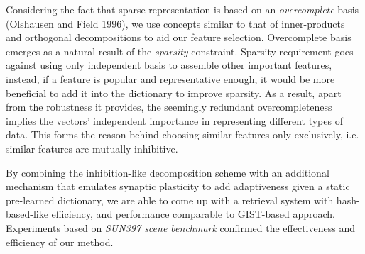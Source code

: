 \documentclass[letterpaper]{article}
\begin{document}
Considering the fact that sparse representation is based on an \emph{overcomplete} basis (Olshausen and Field 1996), we use concepts similar to that of inner-products and orthogonal decompositions to aid our feature selection. Overcomplete basis emerges as a natural result of the \emph{sparsity} constraint. Sparsity requirement goes against using only independent basis to assemble other important features, instead, if a feature is popular and representative enough, it would be more beneficial to add it into the dictionary to improve sparsity. As a result, apart from the robustness it provides, the seemingly redundant overcompleteness implies the vectors' independent importance in representing different types of data. This forms the reason behind choosing similar features only exclusively, i.e. similar features are mutually inhibitive. 

By combining the inhibition-like decomposition scheme with an additional mechanism that emulates synaptic plasticity to add adaptiveness given a static pre-learned dictionary, we are able to come up with a retrieval system with hash-based-like efficiency, and performance comparable to GIST-based approach. Experiments based on \emph{SUN397 scene benchmark} confirmed the effectiveness and efficiency of our method.


\end{document}
